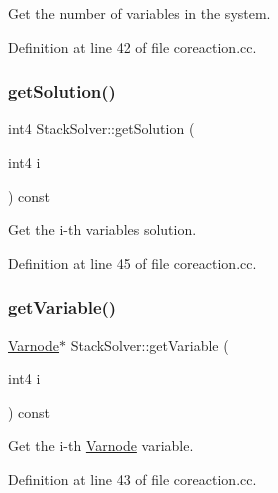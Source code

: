 Get the number of variables in the system. 



Definition at line 42 of file coreaction.\+cc.

\mbox{\label{class_stack_solver_a7e8e971724f289130344b0e52bed302e}} 
\subsubsection{\texorpdfstring{getSolution()}{getSolution()}}
{\footnotesize\ttfamily int4 Stack\+Solver\+::get\+Solution (\begin{DoxyParamCaption}\item[{int4}]{i }\end{DoxyParamCaption}) const\hspace{0.3cm}{\ttfamily [inline]}}



Get the i-\/th variable\textquotesingle{}s solution. 



Definition at line 45 of file coreaction.\+cc.

\mbox{\label{class_stack_solver_afde2924e2df5c143fd7749d812ec1909}} 
\subsubsection{\texorpdfstring{getVariable()}{getVariable()}}
{\footnotesize\ttfamily \mbox{\hyperlink{class_varnode}{Varnode}}$\ast$ Stack\+Solver\+::get\+Variable (\begin{DoxyParamCaption}\item[{int4}]{i }\end{DoxyParamCaption}) const\hspace{0.3cm}{\ttfamily [inline]}}



Get the i-\/th \mbox{\hyperlink{class_varnode}{Varnode}} variable. 



Definition at line 43 of file coreaction.\+cc.

\mbox{\label{class_stack_solver_a441d8ed5d337ba9087093745d7e889c9}} 
